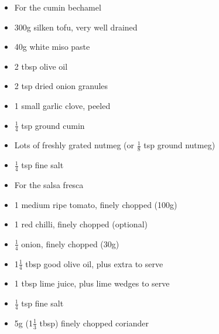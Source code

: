 \documentclass{book}
\begin{document}
\begin{itemize}
\item For the cumin bechamel
\item 300g silken tofu, very well drained
\item 40g white miso paste
\item 2 tbsp olive oil
\item 2 tsp dried onion granules
\item 1 small garlic clove, peeled
\item $\frac{1}{4}$ tsp ground cumin
\item Lots of freshly grated nutmeg (or $\frac{1}{8}$ tsp ground nutmeg)
\item $\frac{1}{4}$ tsp fine salt
\end{itemize}

\begin{itemize}
\item For the salsa fresca
\item 1 medium ripe tomato, finely chopped (100g)
\item 1 red chilli, finely chopped (optional)
\item $\frac{1}{4}$ onion, finely chopped (30g)
\item 1$\frac{1}{4}$ tbsp good olive oil, plus extra to serve
\item 1 tbsp lime juice, plus lime wedges to serve
\item $\frac{1}{4}$ tsp fine salt
\item 5g (1$\frac{1}{3}$ tbsp) finely chopped coriander
\end{itemize}
\end{document}
